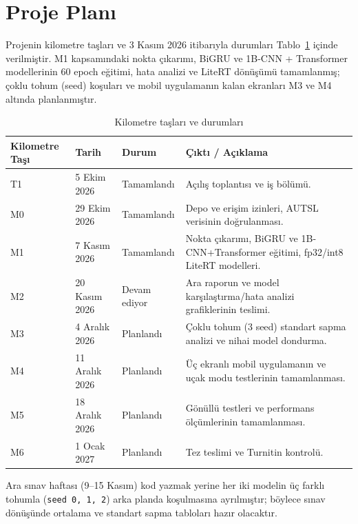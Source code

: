\section{Proje Planı}
\label{BesinciBolum}

Projenin kilometre taşları ve 3 Kasım 2026 itibarıyla durumları
Tablo~\ref{tab:plan} içinde verilmiştir. M1 kapsamındaki nokta çıkarımı, BiGRU ve
1B-CNN + Transformer modellerinin 60 epoch eğitimi, hata analizi ve LiteRT
dönüşümü tamamlanmış; çoklu tohum (seed) koşuları ve mobil uygulamanın kalan
ekranları M3 ve M4 altında planlanmıştır.

\begin{table}[H]
\centering
\caption{Kilometre taşları ve durumları}
\label{tab:plan}
\small
\begin{tabularx}{\textwidth}{@{}l l l X@{}}
\toprule
\textbf{Kilometre Taşı} & \textbf{Tarih} & \textbf{Durum} & \textbf{Çıktı / Açıklama} \\
\midrule
T1 & 5 Ekim 2026 & Tamamlandı & Açılış toplantısı ve iş bölümü. \\
M0 & 29 Ekim 2026 & Tamamlandı & Depo ve erişim izinleri, AUTSL verisinin doğrulanması. \\
M1 & 7 Kasım 2026 & Tamamlandı & Nokta çıkarımı, BiGRU ve 1B-CNN+Transformer eğitimi, fp32/int8 LiteRT modelleri. \\
M2 & 20 Kasım 2026 & Devam ediyor & Ara raporun ve model karşılaştırma/hata analizi grafiklerinin teslimi. \\
M3 & 4 Aralık 2026 & Planlandı & Çoklu tohum (3 seed) standart sapma analizi ve nihai model dondurma. \\
M4 & 11 Aralık 2026 & Planlandı & Üç ekranlı mobil uygulamanın ve uçak modu testlerinin tamamlanması. \\
M5 & 18 Aralık 2026 & Planlandı & Gönüllü testleri ve performans ölçümlerinin tamamlanması. \\
M6 & 1 Ocak 2027 & Planlandı & Tez teslimi ve Turnitin kontrolü. \\
\bottomrule
\end{tabularx}
\end{table}

Ara sınav haftası (9--15 Kasım) kod yazmak yerine her iki modelin üç farklı
tohumla (\texttt{seed 0, 1, 2}) arka planda koşulmasına ayrılmıştır; böylece
sınav dönüşünde ortalama ve standart sapma tabloları hazır olacaktır.
